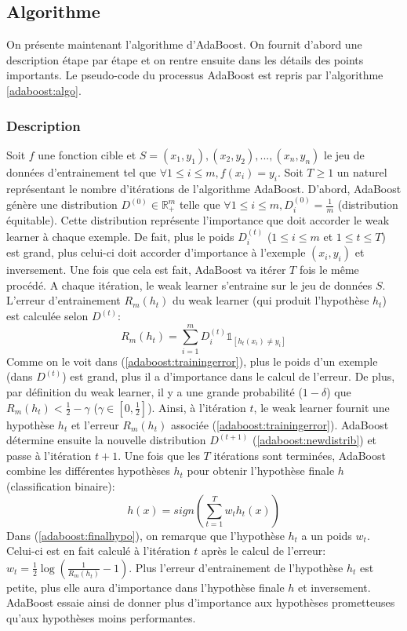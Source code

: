 \documentclass[12pt]{article}
\begin{document}
	\subsection{Algorithme}
	
	On présente maintenant l'algorithme d'AdaBoost. On fournit d'abord une description étape par étape et on rentre ensuite dans les détails des points importants. Le pseudo-code du processus AdaBoost est repris par l'algorithme \ref{adaboost:algo}.
	
	\subsubsection{Description}
	
	Soit $f$ une fonction cible et $S=(x_1,y_1),(x_2,y_2),...,(x_n,y_n)$ le jeu de données d'entrainement
	tel que $\forall 1 \leq i \leq m, f(x_i) = y_i$. Soit $T \geq 1$ un naturel représentant le nombre
	d'itérations de l'algorithme AdaBoost. D'abord, AdaBoost génère une distribution $D^{(0)} \in \mathbb{R}^m_+$
	telle que $\forall 1 \leq i \leq m, D^{(0)}_i = \frac{1}{m}$ (distribution équitable).
	Cette distribution représente l'importance que doit accorder le weak learner à chaque exemple.
	De fait, plus le poids $D^{(t)}_i$ ($1 \leq i \leq m$ et $1 \leq t \leq T$) est grand, plus
	celui-ci doit accorder d'importance à l'exemple $(x_i,y_i)$ et inversement. Une fois que cela
	est fait, AdaBoost va itérer $T$ fois le même procédé. A chaque itération, le weak learner
	s'entraine sur le jeu de données $S$. L'erreur d'entrainement $R_m(h_t)$ du weak learner (qui produit l'hypothèse $h_t$) est
	calculée selon $D^{(t)}$:
	\begin{equation}
		\label{adaboost:trainingerror}
		R_m(h_t) = \sum_{i=1}^m D^{(t)}_i \mathbb{1}_{[h_t(x_i) \neq y_i]}
	\end{equation}
	Comme on le voit dans (\ref{adaboost:trainingerror}), plus le poids d'un exemple (dans $D^{(t)}$) est grand, plus il a d'importance dans le calcul de l'erreur. De plus, par définition du weak learner, il y a une grande probabilité ($1- \delta$) que $R_m(h_t)< \frac{1}{2} - \gamma$ ($\gamma \in [0,\frac{1}{2}]$). Ainsi, à l'itération $t$, le weak learner fournit une hypothèse $h_t$ et l'erreur $R_m(h_t)$ associée (\ref{adaboost:trainingerror}). AdaBoost détermine ensuite la nouvelle distribution $D^{(t+1)}$ (\ref{adaboost:newdistrib}) et passe à l'itération $t+1$. Une fois que les $T$ itérations sont terminées, AdaBoost combine les différentes hypothèses $h_t$ pour obtenir l'hypothèse finale $h$ (classification binaire):
	\begin{equation}
		\label{adaboost:finalhypo}
		h(x) = sign (\sum_{t=1}^T w_t h_t(x))
	\end{equation}
	Dans (\ref{adaboost:finalhypo}), on remarque que l'hypothèse $h_t$ a un poids $w_t$.
	Celui-ci est en fait calculé à l'itération $t$ après le calcul de l'erreur:
	$w_t = \frac{1}{2} \log(\frac{1}{R_m(h_t)} - 1)$. Plus l'erreur d'entrainement de l'hypothèse $h_t$
	est petite, plus elle aura d'importance dans l'hypothèse finale $h$ et inversement.
	AdaBoost essaie ainsi de donner plus d'importance aux hypothèses prometteuses qu'aux hypothèses
	moins performantes.
	
\end{document}
